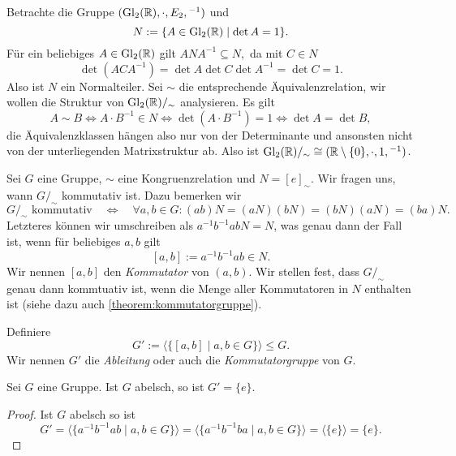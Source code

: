 \begin{example}
    Betrachte die Gruppe $(\operatorname{Gl}_2(\mathbb{R}), \cdot, E_2, {}^{-1})$ und
    $$ N := \{ A \in \operatorname{Gl}_2(\mathbb{R}) \mid \det A = 1 \}. $$
    Für ein beliebiges $A \in \operatorname{Gl}_2(\mathbb{R})$ gilt $ A N A^{-1} \subseteq N, $ da mit $C \in N$
    $$ \det(A C A^{-1}) = \det A \det C \det A^{-1} = \det C = 1. $$
    Also ist $N$ ein Normalteiler. Sei $\sim$ die entsprechende Äquivalenzrelation, wir wollen die Struktur von $\operatorname{Gl}_2(\mathbb{R})/_\sim$ analysieren. Es gilt
    $$ A \sim B \Leftrightarrow A \cdot B^{-1} \in N \Leftrightarrow \det(A \cdot B^{-1}) = 1 \Leftrightarrow \det A = \det B, $$
    die Äquivalenzklassen hängen also nur von der Determinante und ansonsten nicht von der unterliegenden Matrixstruktur ab. Also ist $\operatorname{Gl}_2(\mathbb{R})/_\sim \cong (\mathbb{R} \setminus \{0\}, \cdot, 1, {}^{-1})$.
\end{example}

\begin{remark}
    Sei $G$ eine Gruppe, $\sim$ eine Kongruenzrelation und $N=[e]_\sim$. Wir fragen uns, wann $G/_\sim$ kommutativ ist. Dazu bemerken wir
    $$ G/_\sim \textrm{ kommutativ} \quad \Leftrightarrow \quad \forall a, b \in G: (ab)N = (aN) (bN) = (bN) (aN) = (ba)N. $$
    Letzteres können wir umschreiben als $a^{-1} b^{-1} a b N = N$, was genau dann der Fall ist, wenn für beliebiges $a, b$ gilt
    $$ [a, b] := a^{-1} b^{-1} a b \in N. $$
    Wir nennen $[a, b]$ den \emph{Kommutator}  von $(a, b)$. Wir stellen fest, dass $G/_\sim$ genau dann kommtuativ ist, wenn die Menge aller Kommutatoren in $N$ enthalten ist (siehe dazu auch \cref{theorem:kommutatorgruppe}).
\end{remark}

\begin{definition}
    Definiere
    $$ G' := \langle \{ [a, b] \mid a, b \in G \} \rangle \leq G. $$
    Wir nennen $G'$ die \emph{Ableitung} oder auch die \emph{Kommutatorgruppe} von $G$. 
\end{definition}
    
\begin{proposition}
    Sei $G$ eine Gruppe. Ist $G$ abelsch, so ist $G' = \{ e \}$.
\end{proposition}

\begin{proof}
    Ist $G$ abelsch so ist
    $$ G' = \langle \{ a^{-1} b^{-1} a b \mid a, b \in G \} \rangle = \langle \{ a^{-1} b^{-1} b a \mid a, b \in G \} \rangle = \langle \{e\} \rangle = \{e\}. $$
\end{proof}

